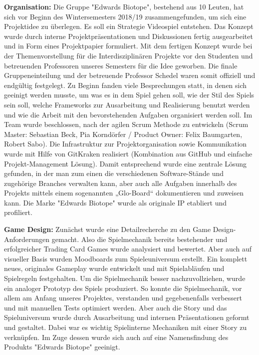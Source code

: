 \textbf{Organisation:}
Die Gruppe "Edwards Biotope", bestehend aus 10 Leuten, hat sich vor Beginn des Wintersemesters 2018/19 zusammengefunden, um sich eine Projektidee zu überlegen. Es soll ein Strategie Videospiel entstehen. Das Konzept wurde durch interne Projektpräsentationen und Diskussionen fertig ausgearbeitet und in Form eines Projektpapier formuliert. Mit dem fertigen Konzept wurde bei der Themenvorstellung für die Interdisziplinären Projekte vor den Studenten und betreuenden Professoren unseres Semesters für die Idee geworben. Die finale Gruppeneinteilung und der betreuende Professor Schedel waren somit offiziell und endgültig festgelegt. Zu Beginn fanden viele Besprechungen statt, in denen sich geeinigt werden musste, um was es in dem Spiel gehen soll, wie der Stil des Spiels sein soll, welche Frameworks zur Ausarbeitung und Realisierung benutzt werden und wie die Arbeit mit den bevorstehenden Aufgaben organisiert werden soll. Im Team wurde beschlossen, nach der agilen Scrum Methode zu entwickeln (Scrum Master: Sebastian Beck, Pia Korndörfer / Product Owner: Felix Baumgarten, Robert Sabo). Die Infrastruktur zur Projektorganisation sowie Kommunikation wurde mit Hilfe von GitKraken realisiert (Kombination aus GitHub und einfache Projekt-Management Lösung). Damit entsprechend wurde eine zentrale Lösung gefunden, in der man zum einen die verschiedenen Software-Stände und zugehörige Branches verwalten kann, aber auch alle Aufgaben innerhalb des Projekts mittels einem sogenannten „Glo-Board“ dokumentieren und zuweisen kann. Die Marke "Edwards Biotope" wurde als originale IP etabliert und profiliert.

\textbf{Game Design:}
Zunächst wurde eine Detailrecherche zu den Game Design-Anforderungen gemacht. Also die Spielmechanik bereits bestehender und erfolgreicher Trading Card Games wurde analysiert und bewertet. Aber auch auf visueller Basis wurden Moodboards zum Spieleuniversum erstellt. Ein komplett neues, originales Gameplay wurde entwickelt und mit Spielabläufen und Spielregeln festgehalten. Um die Spielmechanik besser nachzuvollziehen, wurde ein analoger Prototyp des Spiels produziert. So konnte die Spielmechanik, vor allem am Anfang unseres Projektes, verstanden und gegebenenfalls verbessert und mit manuellen Tests optimiert werden. Aber auch die Story und das Spieluniversum wurde durch Ausarbeitung und internen Präsentationen geformt und gestaltet. Dabei war es wichtig Spielinterne Mechaniken mit einer Story zu verknüpfen. Im Zuge dessen wurde sich auch auf eine Namensfindung des Produkts "Edwards Biotope" geeinigt.

